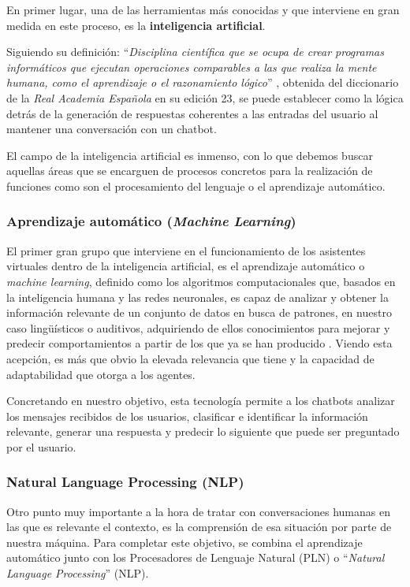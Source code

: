 En primer lugar, una de las herramientas más conocidas y que interviene en gran medida en este proceso, es la \textbf{inteligencia artificial}.

Siguiendo su definición: ``\textit{Disciplina científica que se ocupa de crear programas informáticos que ejecutan operaciones comparables a las que realiza la mente humana, como el aprendizaje o el razonamiento lógico}'' \cite{intelige84:online}, obtenida del diccionario de la \textit{Real Academia Española} en su edición 23, se puede establecer como la lógica detrás de la generación de respuestas coherentes a las entradas del usuario al mantener una conversación con un chatbot. 

El campo de la inteligencia artificial es inmenso, con lo que debemos buscar aquellas áreas que se encarguen de procesos concretos para la realización de funciones como son el procesamiento del lenguaje o el aprendizaje automático.

\subsubsection{Aprendizaje automático (\textit{Machine Learning})}
El primer gran grupo que interviene en el funcionamiento de los asistentes virtuales dentro de la inteligencia artificial, es el aprendizaje automático o \textit{machine learning}, definido como los algoritmos computacionales que, basados en la inteligencia humana y las redes neuronales, es capaz de analizar y obtener la información relevante de un conjunto de datos en busca de patrones, en nuestro caso lingüísticos o auditivos, adquiriendo de ellos conocimientos para mejorar y predecir comportamientos a partir de los que ya se han producido \cite{el2015machine}. Viendo esta acepción, es más que obvio la elevada relevancia que tiene y la capacidad de adaptabilidad que otorga a los agentes.

Concretando en nuestro objetivo, esta tecnología permite a los chatbots analizar los mensajes recibidos de los usuarios, clasificar e identificar la información relevante, generar una respuesta y predecir lo siguiente que puede ser preguntado por el usuario.

\subsubsection{Natural Language Processing (NLP)}
Otro punto muy importante a la hora de tratar con conversaciones humanas en las que es relevante el contexto, es la comprensión de esa situación por parte de nuestra máquina. Para completar este objetivo, se combina el aprendizaje automático junto con los Procesadores de Lenguaje Natural (PLN) o ``\textit{Natural Language Processing}'' (NLP).

